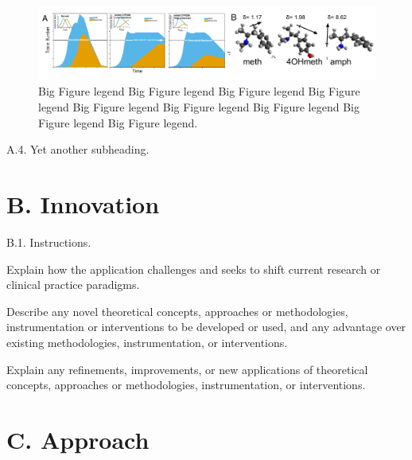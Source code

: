 \documentclass[11pt,notitlepage]{article}
\begin{document}
\lipsum[25]

\begin{figure}[b c] %
\centering
\includegraphics[scale = .80]{Figures/Fig2.pdf}
\caption{\footnotesize Big Figure legend Big Figure legend Big Figure legend Big Figure legend Big Figure legend Big Figure legend Big Figure legend Big Figure legend Big Figure legend.}
\label{fig2}
\end{figure}

\lipsum[31-32]

\begin{description}
\item[A.4. Yet another subheading.]{}
\end{description}

\lipsum[55-56]


\section*{B. Innovation}

\begin{description}
\item[B.1. Instructions.]{}
\end{description}

Explain how the application challenges and seeks to shift current research or clinical practice paradigms.

Describe any novel theoretical concepts, approaches or methodologies, instrumentation or interventions to be developed or used, and any advantage over existing methodologies, instrumentation, or interventions.

Explain any refinements, improvements, or new applications of theoretical concepts, approaches or methodologies, instrumentation, or interventions.


\section*{C. Approach}
\end{document}
